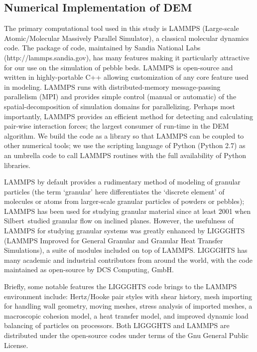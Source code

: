 \subsection{Numerical Implementation of DEM}\label{sec:dem-solver}


The primary computational tool used in this study is LAMMPS (Large-scale Atomic/Molecular Massively Parallel Simulator),\cite{Plimpton1995} a classical molecular dynamics code. The package of code, maintained by Sandia National Labs (http://lammps.sandia.gov), has many features making it particularly attractive for our use on the simulation of pebble beds. LAMMPS is open-source and written in highly-portable C++ allowing customization of any core feature used in modeling. LAMMPS runs with distributed-memory message-passing parallelism (MPI) and provides simple control (manual or automatic) of the spatial-decomposition of simulation domains for parallelizing. Perhaps most importantly, LAMMPS provides an efficient method for detecting and calculating pair-wise interaction forces; the largest consumer of run-time in the DEM algorithm\cite{Plimpton1995}. We build the code as a library so that LAMMPS can be coupled to other numerical tools; we use the scripting language of Python (Python 2.7) as an umbrella code to call LAMMPS routines with the full availability of Python libraries. 

LAMMPS by default provides a rudimentary method of modeling of granular particles (the term `granular' here differentiates the `discrete element' of molecules or atoms from larger-scale granular particles of powders or pebbles); LAMMPS has been used for studying granular material since at least 2001 when Silbert\etal~studied granular flow on inclined planes.\cite{Silbert2001} However, the usefulness of LAMMPS for studying granular systems was greatly enhanced by LIGGGHTS (LAMMPS Improved for General Granular and Granular Heat Transfer Simulations), a suite of modules included on top of LAMMPS. LIGGGHTS has many academic and industrial contributors from around the world, with the code maintained as open-source by DCS Computing, GmbH.

Briefly, some notable features the LIGGGHTS code brings to the LAMMPS environment include: Hertz/Hooke pair styles with shear history, mesh importing for handling wall geometry, moving meshes, stress analysis of imported meshes, a macroscopic cohesion model, a heat transfer model, and improved dynamic load balancing of particles on processors\cite{Kloss2011,Kloss2012}. Both LIGGGHTS and LAMMPS are distributed under the open-source codes under terms of the Gnu General Public License.\cite{FreeSoftwareFoundationInc.2007}



